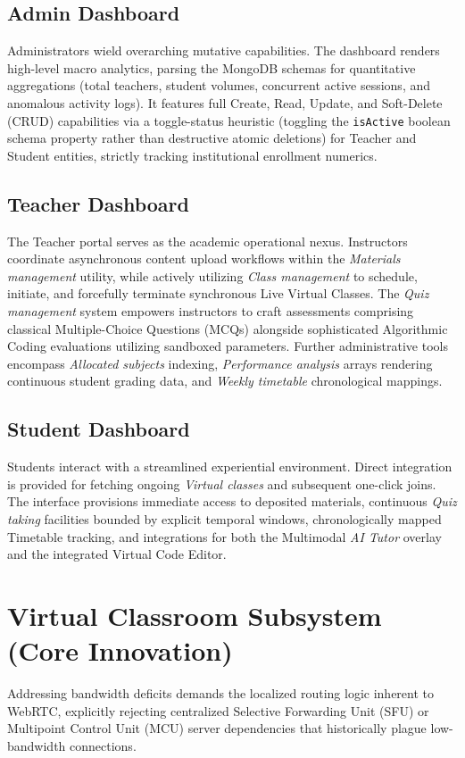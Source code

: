 \documentclass[12pt, journal, onecolumn]{IEEEtran}
\begin{document}
\subsection{Admin Dashboard}
Administrators wield overarching mutative capabilities. The dashboard renders high-level macro analytics, parsing the MongoDB schemas for quantitative aggregations (total teachers, student volumes, concurrent active sessions, and anomalous activity logs). It features full Create, Read, Update, and Soft-Delete (CRUD) capabilities via a toggle-status heuristic (toggling the \texttt{isActive} boolean schema property rather than destructive atomic deletions) for Teacher and Student entities, strictly tracking institutional enrollment numerics.

\subsection{Teacher Dashboard}
The Teacher portal serves as the academic operational nexus. Instructors coordinate asynchronous content upload workflows within the \textit{Materials management} utility, while actively utilizing \textit{Class management} to schedule, initiate, and forcefully terminate synchronous Live Virtual Classes. The \textit{Quiz management} system empowers instructors to craft assessments comprising classical Multiple-Choice Questions (MCQs) alongside sophisticated Algorithmic Coding evaluations utilizing sandboxed parameters. Further administrative tools encompass \textit{Allocated subjects} indexing, \textit{Performance analysis} arrays rendering continuous student grading data, and \textit{Weekly timetable} chronological mappings.

\subsection{Student Dashboard}
Students interact with a streamlined experiential environment. Direct integration is provided for fetching ongoing \textit{Virtual classes} and subsequent one-click joins. The interface provisions immediate access to deposited materials, continuous \textit{Quiz taking} facilities bounded by explicit temporal windows, chronologically mapped Timetable tracking, and integrations for both the Multimodal \textit{AI Tutor} overlay and the integrated Virtual Code Editor.

\section{Virtual Classroom Subsystem (Core Innovation)}
Addressing bandwidth deficits demands the localized routing logic inherent to WebRTC, explicitly rejecting centralized Selective Forwarding Unit (SFU) or Multipoint Control Unit (MCU) server dependencies that historically plague low-bandwidth connections.
\end{document}
